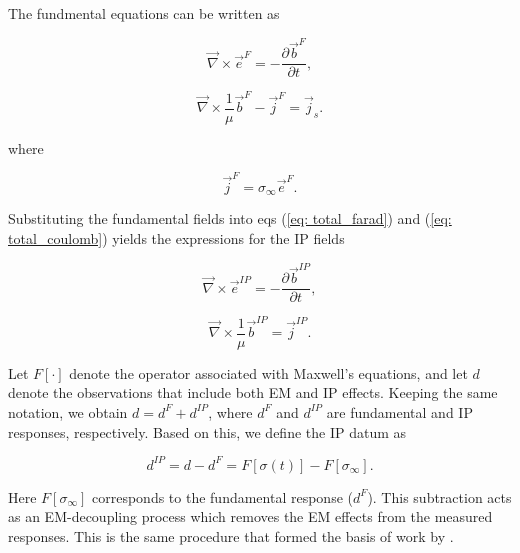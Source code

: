 \documentclass[extra,mreferee]{gji}
\newcommand{\curl}{{\vec \nabla}\times}
\newcommand{\siginf}{\sigma_\infty}
\renewcommand {\j}  { {\vec j} }
\renewcommand {\b}  { {\vec b} }
\newcommand {\e}  { {\vec e} }
\newcommand{\dip}{d^{IP}}
\begin{document}
The fundmental equations can be written as
\begin{linenomath*}
\begin{equation}
  \curl \e^{F} = -\frac{\partial \b^{F}}{\partial t},
  \label{eq: eq_primary_farad}
\end{equation}
\end{linenomath*}
\begin{linenomath*}
\begin{equation}
  \curl{\frac{1}{\mu}\b^{F}} -\j^{F} = \j_s.
  \label{eq: eq_primary_coulomb}
\end{equation}
\end{linenomath*}
where
\begin{linenomath*}
\begin{equation}
  \j^{F} = \siginf\e^{F}.
  \label{eq: jF}
\end{equation}
\end{linenomath*}

Substituting the fundamental fields into eqs (\ref{eq: total_farad}) and (\ref{eq: total_coulomb}) yields the expressions for the IP fields 
\begin{linenomath*}
\begin{equation}
  \curl \e^{IP} = -\frac{\partial \b^{IP}}{\partial t},
  \label{eq: eq_secondary_farad}
\end{equation}
\end{linenomath*}
\begin{linenomath*}
\begin{equation}
  \curl{\frac{1}{\mu}\b^{IP}} = \j^{IP}.
  \label{eq: eq_secondary_coulomb}
\end{equation}
\end{linenomath*}

Let $F[\cdot]$ denote the operator associated with Maxwell’s equations, and let $d$ denote the observations that include both EM and IP effects. 
Keeping the same notation, we obtain $d = d^{F} + \dip$, where $d^F$ and $\dip$ are fundamental and IP responses, respectively. 
Based on this, we define the IP datum as 
\begin{linenomath*}
\begin{equation}
  \dip = d - d^{F} = F[\sigma(t)]-F[\siginf].
    \label{eq: IPdatum_syn}
\end{equation}
\end{linenomath*}
Here $F[\siginf]$ corresponds to the fundamental response ($d^F$). 
This subtraction acts as an EM-decoupling process which removes the EM effects from the measured responses. This is the same procedure that formed the basis of work by \cite{routh2001}. 
\end{document}
